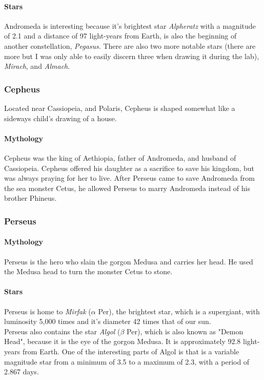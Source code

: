 \documentclass{article}
\begin{document}
\paragraph{Stars}
Andromeda is interesting because it's brightest star \emph{Alpheratz} with a magnitude of 2.1 and a distance of 97 light-years from Earth, is also the beginning of another constellation, \emph{Pegasus}.  There are also two more notable stars (there are more but I was only able to easily discern three when drawing it during the lab), \emph{Mirach}, and \emph{Almach}.

\subsubsection{Cepheus}
Located near Cassiopeia, and Polaris, Cepheus is shaped somewhat like a sideways child's drawing of a house.
\paragraph{Mythology}
Cepheus was the king of Aethiopia, father of Andromeda, and husband of Cassiopeia.  Cepheus offered his daughter as a sacrifice to save his kingdom, but was always praying for her to live. After Perseus came to save Andromeda from the sea monster Cetus, he allowed Perseus to marry Andromeda instead of his brother Phineus. \cite{cepheusmyth}
\subsubsection{Perseus}
\paragraph{Mythology}
Perseus is the hero who slain the gorgon Medusa and carries her head.  He used the Medusa head to turn the monster Cetus to stone. \cite{perseusmyth} 
\paragraph{Stars}
Perseus is home to \emph{Mirfak} ($\alpha$ Per), the brightest star, which is a supergiant, with luminosity 5,000 times and it's diameter 42 times that of our sun. \\ \cite{perseusstarmap}
Perseus also contains the star \emph{Algol} ($\beta$ Per), which is also known as "Demon Head", because it is the eye of the gorgon Medusa.  It is approximately 92.8 light-years from Earth.  One of the interesting parts of Algol is that is a variable magnitude star from a minimum of 3.5 to a maximum of 2.3, with a period of 2.867 days. \cite{perseus}
\end{document}
